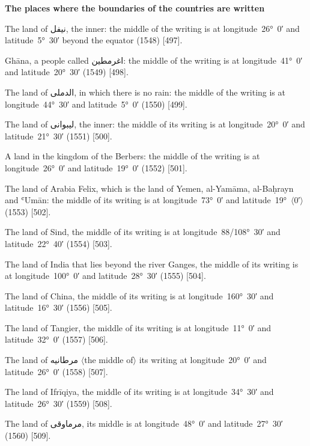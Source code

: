 \documentclass[11pt]{article}
\newcommand{\Pg}[1]{\marginpar{\footnotesize #1}}
\newcommand{\Ang}[1]{\ensuremath{#1}}
\begin{document}
\par\medskip\begin{center}\bfseries The places where the boundaries of the countries are written\end{center}\par

The land of \textarabic{نيفل}, the inner: the middle of the writing is at longitude~26°~0′ and latitude~5°~30′ beyond the equator (1548) [497].

Ghāna, a people called \textarabic{اغرمطين}: the middle of the writing is at longitude~41°~0′ and latitude~20°~30′ (1549) [498].

The land of \textarabic{الدملى}, in which there is no rain: the middle of the writing is at longitude~44°~30′ and latitude~5°~0′ (1550) [499].

The land of \textarabic{ليبوانى}, the inner: the middle of its writing is at longitude~20°~0′ and latitude~21°~30′ (1551) [500]\Pg{p. 102}.

A land in the kingdom of the Berbers: the middle of the writing is at longitude~26°~0′ and latitude~19°~0′ (1552) [501].

The land of Arabia Felix, which is the land of Yemen, al-Yamāma, al-Baḥrayn and ʿUmān: the middle of its writing is at longitude~73°~0′ and latitude~19°~\Ang{\langle}0′\Ang{\rangle} (1553) [502].

The land of Sind, the middle of its writing is at longitude~88/108°~30′ and latitude~22°~40′ (1554) [503].

The land of India that lies beyond the river Ganges, the middle of its writing is at longitude~100°~0′ and latitude~28°~30′ (1555) [504].

The land of China, the middle of its writing is at longitude~160°~30′ and latitude~16°~30′ (1556) [505].

The land of Tangier, the middle of its writing is at longitude~11°~0′ and latitude~32°~0′ (1557) [506].

The land of \textarabic{مرطانيه} \Ang{\langle}the middle of\Ang{\rangle} its writing at longitude~20°~0′ and latitude~26°~0′ (1558) [507].

The land of Ifrīqiya, the middle of its writing is at longitude~34°~30′ and latitude~26°~30′ (1559) [508].

The land of \textarabic{مرماوقى}, its middle is at longitude~48°~0′ and latitude~27°~30′ (1560) [509].
\end{document}
